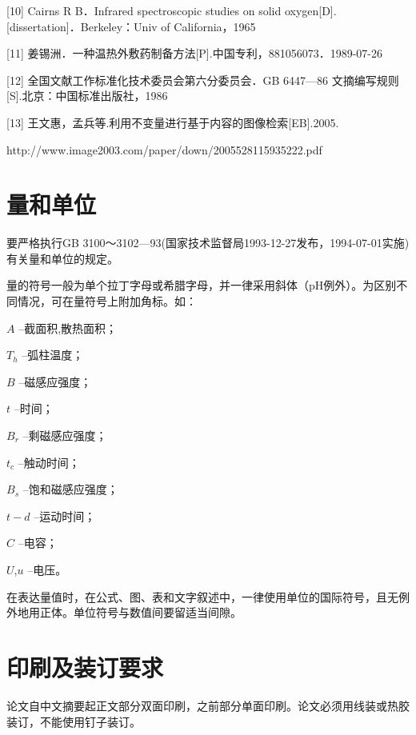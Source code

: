 [10] Cairns R B．Infrared spectroscopic studies on solid oxygen[D].[dissertation]．Berkeley：Univ of California，1965 

[11] 姜锡洲．一种温热外敷药制备方法[P].中国专利，881056073．1989-07-26 

[12] 全国文献工作标准化技术委员会第六分委员会．GB 6447—86 文摘编写规则[S].北京：中国标准出版社，1986 

[13] 王文惠，孟兵等.利用不变量进行基于内容的图像检索[EB].2005.

http://www.image2003.com/paper/down/2005528115935222.pdf

\section{量和单位}

要严格执行GB 3100～3102—93(国家技术监督局1993-12-27发布，1994-07-01实施)有关量和单位的规定。

量的符号一般为单个拉丁字母或希腊字母，并一律采用斜体（pH例外）。为区别不同情况，可在量符号上附加角标。如：

$A$	--截面积,散热面积；

$T_h$	--弧柱温度；

$B$	--磁感应强度；

$t$	--时间；

$B_r$	--剩磁感应强度；

$t_c$	--触动时间；

$B_s$	--饱和磁感应强度；

$t-d$	--运动时间；

$C$	--电容；

$U$,$u$	--电压。

在表达量值时，在公式、图、表和文字叙述中，一律使用单位的国际符号，且无例外地用正体。单位符号与数值间要留适当间隙。


\section{印刷及装订要求}
论文自中文摘要起正文部分双面印刷，之前部分单面印刷。论文必须用线装或热胶装订，不能使用钉子装订。